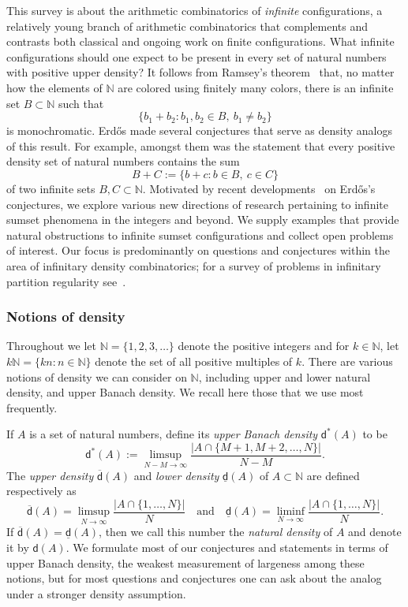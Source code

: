 \documentclass[10pt,dvipsnames]{article}
\theoremstyle{definition}
\theoremstyle{plain}
\newcommand{\define}[1]{\textit{#1}}
\newcommand{\N}{\mathbb{N}}
\newcommand{\dens}{\mathsf{d}}
\newcommand{\udens}{\overline{\mathsf{d}}}
\newcommand{\ldens}{\underline{\mathsf{d}}}
\newcommand{\ubdens}{\mathsf{d}^*}
\newcommand{\Erdos}{Erd\H{o}s}
\begin{document}
This survey is about the arithmetic combinatorics of \textit{infinite} configurations, a relatively young branch of arithmetic combinatorics that complements and contrasts both classical and ongoing work on finite configurations. 
What infinite configurations should one expect to be present in every set of natural numbers with positive upper density? 
It follows from Ramsey's theorem~\cite{ramsey} that, no matter how the elements of $\N$ are colored using finitely many colors, there is an infinite set $B \subset \N$ such that
\[
\{ b_1 + b_2 : b_1,b_2 \in  B,~ b_1 \ne b_2 \}
\]
is monochromatic.
\Erdos{} made several conjectures that serve as density analogs of this result.
For example, amongst them was the statement that every positive density set of natural numbers contains the sum
\[
B+C := \{ b+c:b\in B,~ c\in C \}
\]
of two infinite sets $B,C \subset \N$.
Motivated by recent developments~\cite{ bergelson,choi-heath,DGJLLM15, Host,KMRR,KMRR2,MRR,Nathanson} on \Erdos{}'s conjectures, we explore various new directions of research pertaining to infinite sumset phenomena in the integers and beyond.  
We supply examples that provide natural obstructions to infinite sumset configurations and collect open problems of interest. 
Our focus is predominantly on questions and conjectures within the area of infinitary density combinatorics; for a survey of problems in infinitary partition regularity see~\cite{HLS03}.

\subsubsection*{Notions of density}
\label{subsec:density}

Throughout we let $\N=\{1,2,3,\ldots\}$ denote the positive integers and for $k\in\N$, let $k\N=\{kn:n\in\N\}$ denote the set of all positive multiples of $k$.
There are various notions of density we can consider on $\N$, including upper and lower natural density, and upper Banach density. We recall here those that we use most frequently.

If $A$ is a set of natural numbers, define its \define{upper Banach density} $\ubdens(A)$ to be
\begin{equation}
\label{eqn:positive_upper_density}
\ubdens(A):=\limsup_{N -M\to \infty} \frac{\big|A\cap \{M+1,M+2,\dots,N\}\big|}{N-M}.
\end{equation}
The \define{upper density} $\udens(A)$ and \define{lower density} $\ldens(A)$ of $A\subset\N$ are defined respectively as
\[
\udens(A)=\limsup_{N\to\infty}\frac{|A\cap\{1,\ldots,N\}|}{N}
\quad\text{and}\quad 
\ldens(A)=\liminf_{N\to\infty}\frac{|A\cap\{1,\ldots,N\}|}{N}.
\]
If $\udens(A) = \ldens(A)$, then we call this number the \define{natural  density} of $A$ and denote it by $\dens(A)$.
We formulate most of our conjectures and statements in terms of upper Banach density, the weakest measurement of largeness among these notions, but for most questions and conjectures one can ask about the analog under a stronger density assumption. 
\end{document}
